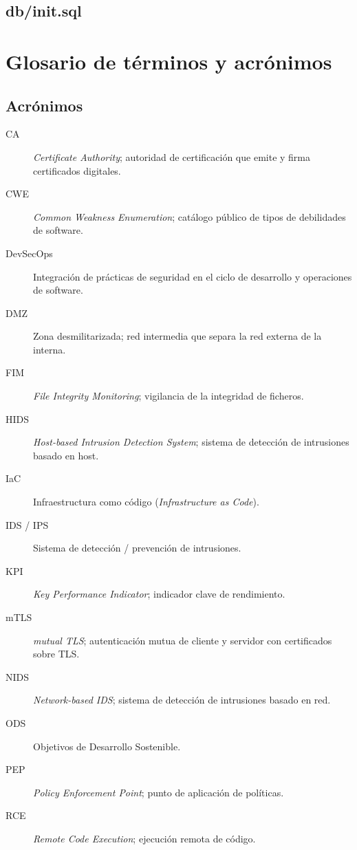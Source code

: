 \documentclass[11pt,spanish,listoffigures,listoftables]{tfgetsinf}
\begin{document}
\section{db/init.sql}


\chapter{Glosario de términos y acrónimos}
\label{anexo:glosario}

\section{Acrónimos}

\begin{description}
    \item[CA] \textit{Certificate Authority}; autoridad de certificación que emite y firma certificados digitales.
    \item[CWE] \textit{Common Weakness Enumeration}; catálogo público de tipos de debilidades de software.
    \item[DevSecOps] Integración de prácticas de seguridad en el ciclo de desarrollo y operaciones de software.
    \item[DMZ] Zona desmilitarizada; red intermedia que separa la red externa de la interna.
    \item[FIM] \textit{File Integrity Monitoring}; vigilancia de la integridad de ficheros.
    \item[HIDS] \textit{Host-based Intrusion Detection System}; sistema de detección de intrusiones basado en host.
    \item[IaC] Infraestructura como código (\textit{Infrastructure as Code}).
    \item[IDS / IPS] Sistema de detección / prevención de intrusiones.
    \item[KPI] \textit{Key Performance Indicator}; indicador clave de rendimiento.
    \item[mTLS] \textit{mutual TLS}; autenticación mutua de cliente y servidor con certificados sobre TLS.
    \item[NIDS] \textit{Network-based IDS}; sistema de detección de intrusiones basado en red.
    \item[ODS] Objetivos de Desarrollo Sostenible.
    \item[PEP] \textit{Policy Enforcement Point}; punto de aplicación de políticas.
    \item[RCE] \textit{Remote Code Execution}; ejecución remota de código.

\end{description}
\end{document}

